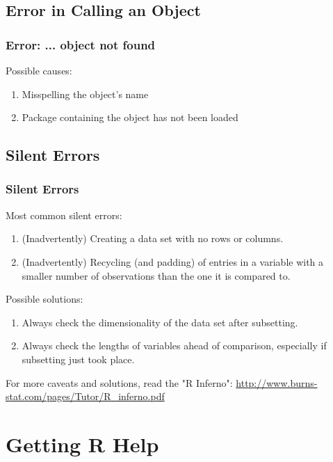 \subsection{Error in Calling an Object}
\begin{frame}[fragile]
  \frametitle{\ttfamily Error: ... object not found \normalfont}
Possible causes:
  \begin{enumerate}
    \item Misspelling the object's name
    \item Package containing the object has not been loaded
  \end{enumerate}
  
\end{frame}

\subsection{Silent Errors}
\begin{frame}[fragile]
  \frametitle{Silent Errors}
Most common silent errors:
  \begin{enumerate}
    \item (Inadvertently) Creating a data set with no rows or columns. 
    \item (Inadvertently) Recycling (and padding) of entries in a variable with a smaller number of observations than the one it is compared to.  
  \end{enumerate}
Possible solutions:
  \begin{enumerate}
    \item Always check the dimensionality of the data set after subsetting.
    \item Always check the lengths of variables ahead of comparison, especially if subsetting just took place.
  \end{enumerate}   
\noindent For more caveats and solutions, read the "R Inferno": \url{http://www.burns-stat.com/pages/Tutor/R_inferno.pdf}
  
\end{frame}

\section[Help]{Getting R Help}

